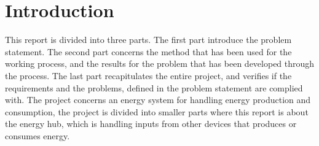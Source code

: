 \chapter{Introduction}
This report is divided into three parts. The first part introduce the problem statement. The second part concerns the method that has been used for the working process, and the results for the problem that has been developed through the process. The last part recapitulates the entire project, and verifies if the requirements and the problems, defined in the problem statement are complied with.
The project concerns an energy system for handling energy production and consumption, the project is divided into smaller parts where this report is about the energy hub, which is handling inputs from other devices that produces or consumes energy.
